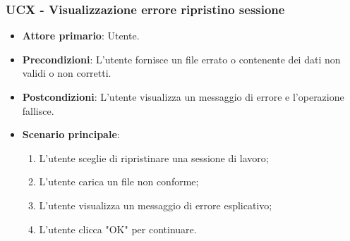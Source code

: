 \subsubsection{UCX - Visualizzazione errore ripristino sessione}
\begin{itemize}
	\item \textbf{Attore primario}: Utente.
	\item \textbf{Precondizioni}: L'utente fornisce un file errato o contenente dei dati non validi o non corretti.
	\item \textbf{Postcondizioni}: L'utente visualizza un messaggio di errore e l'operazione fallisce.
	\item \textbf{Scenario principale}:
		\begin{enumerate}
		\item L'utente sceglie di ripristinare una sessione di lavoro;
		\item L'utente carica un file non conforme;
			\item L'utente visualizza un messaggio di errore esplicativo;
			\item L'utente clicca "OK" per continuare.
		\end{enumerate}
\end{itemize}